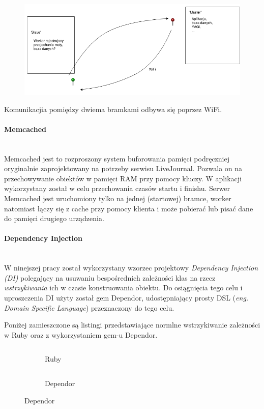 \documentclass[11pt,a4paper, twoside]{article}
\begin{document}
\begin{figure}[ht]
\includegraphics[scale=0.5]{./img/asdasd.png}
\end{figure}
\noindent
Komunikacjia pomiędzy dwiema bramkami odbywa się poprzez WiFi.
\paragraph{Memcached} ~\\
\newline
Memcached jest to rozproszony system buforowania pamięci podręczniej oryginalnie zaprojektowany na potrzeby serwisu  LiveJournal. Pozwala on na przechowywanie obiektów w pamięci RAM przy pomocy kluczy. W aplikacji wykorzystany został w celu przechowania czasów startu i finishu. Serwer Memcached jest uruchomiony tylko na jednej (startowej) bramce, worker natomiast łączy się z cache przy pomocy klienta i może pobierać lub pisać dane do pamięci drugiego urządzenia.
\paragraph{Dependency Injection} ~\\
\newline
W ninejszej pracy został wykorzystany wzorzec projektowy \emph{Dependency Injection (DI)} polegający na usuwaniu bespośrednich zależności klas na rzecz \emph{wstrzykiwania} ich w czasie konstruowania obiektu. Do osiągnięcia tego celu i uproszczenia  DI użyty został gem Dependor, udostępniający prosty DSL (\emph{eng. Domain Specific Language}) przeznaczony do tego celu.

Poniżej zamieszczone są listingi przedstawiające normlne wstrzykiwanie zależności w Ruby oraz z wykorzystaniem gem-u Dependor.
\newline


\begin{figure}[h]
\centering
\begin{subfigure}[t]{0.45\textwidth}
\caption{Ruby}
\begin{listing}[H]
\inputminted[linenos=true]{ruby}{./src/di_ruby.rb}
\end{listing}
\end{subfigure}
\begin{subfigure}[t]{0.45\textwidth}
\caption{Dependor}
\begin{listing}[H]
\inputminted{ruby}{./src/di_dependor.rb}
\end{listing}
\end{subfigure}
\end{figure}
\end{document}
